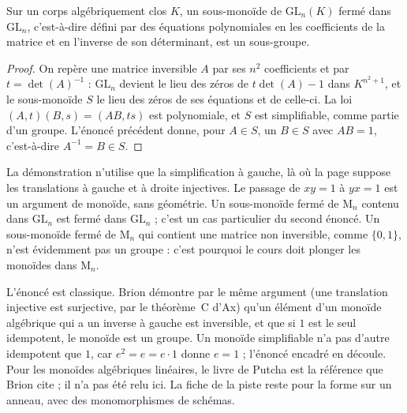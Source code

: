 \begin{encadre}
\begin{enonce}
Sur un corps algébriquement clos $K$, un sous-monoïde de $\mathrm{GL}_n(K)$ fermé dans $\mathrm{GL}_n$, c'est-à-dire défini par des équations polynomiales en les coefficients de la matrice et en l'inverse de son déterminant, est un sous-groupe.
\end{enonce}
\end{encadre}

\begin{proof}
On repère une matrice inversible $A$ par ses $n^2$ coefficients et par $t = \det(A)^{-1}$ : $\mathrm{GL}_n$ devient le lieu des zéros de $t \det(A) - 1$ dans $K^{n^2 + 1}$, et le sous-monoïde $S$ le lieu des zéros de ses équations et de celle-ci. La loi $(A, t)(B, s) = (AB, ts)$ est polynomiale, et $S$ est simplifiable, comme partie d'un groupe. L'énoncé précédent donne, pour $A \in S$, un $B \in S$ avec $AB = 1$, c'est-à-dire $A^{-1} = B \in S$.
\end{proof}

\begin{remarque}
La démonstration n'utilise que la simplification à gauche, là où la page suppose les translations à gauche et à droite injectives. Le passage de $xy = 1$ à $yx = 1$ est un argument de monoïde, sans géométrie. Un sous-monoïde fermé de $\mathrm{M}_n$ contenu dans $\mathrm{GL}_n$ est fermé dans $\mathrm{GL}_n$ ; c'est un cas particulier du second énoncé. Un sous-monoïde fermé de $\mathrm M_n$ qui contient une matrice non inversible, comme $\{0, 1\}$, n'est évidemment pas un groupe : c'est pourquoi le cours doit plonger les monoïdes dans $\mathrm M_n$.
\end{remarque}

\begin{remarque}
L'énoncé est classique. Brion \cite[§\,2.2, prop.~3]{brion2014} démontre par le même argument (une translation injective est surjective, par le théorème~C d'Ax) qu'un élément d'un monoïde algébrique qui a un inverse à gauche est inversible, et que si $1$ est le seul idempotent, le monoïde est un groupe. Un monoïde simplifiable n'a pas d'autre idempotent que $1$, car $e^2 = e = e \cdot 1$ donne $e = 1$ ; l'énoncé encadré en découle. Pour les monoïdes algébriques linéaires, le livre de Putcha \cite{putcha1988} est la référence que Brion cite ; il n'a pas été relu ici. La fiche de la piste reste  pour la forme sur un anneau, avec des monomorphismes de schémas.
\end{remarque}

